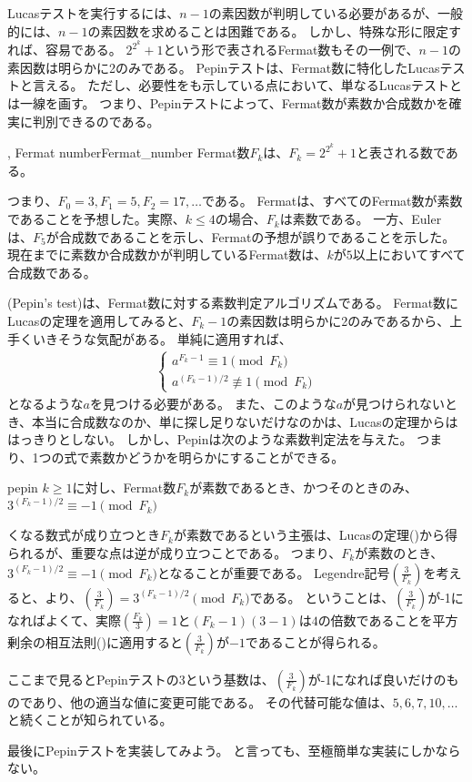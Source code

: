 Lucasテストを実行するには、$n-1$の素因数が判明している必要があるが、一般的には、$n-1$の素因数を求めることは困難である。
しかし、特殊な形に限定すれば、容易である。
$2^{2^k} + 1$という形で表されるFermat数もその一例で、$n-1$の素因数は明らかに2のみである。
Pepinテストは、Fermat数に特化したLucasテストと言える。
ただし、必要性をも示している点において、単なるLucasテストとは一線を画す。
つまり、Pepinテストによって、Fermat数が素数か合成数かを確実に判別できるのである。

\begin{Defi}{, Fermat number}{Fermat_number}
Fermat数$F_k$は、$F_k=2^{2^k} + 1$と表される数である。
\end{Defi}

つまり、$F_0=3, F_1 = 5, F_2 = 17,\ldots$である。
Fermatは、すべてのFermat数が素数であることを予想した。実際、$k \le 4$の場合、$F_k$は素数である。
一方、Eulerは、$F_5$が合成数であることを示し、Fermatの予想が誤りであることを示した。
現在までに素数か合成数かが判明しているFermat数は、$k$が$5$以上においてすべて合成数である。

(Pepin's test)は、Fermat数に対する素数判定アルゴリズムである。
Fermat数にLucasの定理を適用してみると、$F_k - 1$の素因数は明らかに2のみであるから、上手くいきそうな気配がある。
単純に適用すれば、
\begin{align*}
\begin{cases}
a^{F_k-1} \equiv 1 \pmod{F_k}\\
a^{(F_k-1)/2} \not\equiv 1 \pmod{F_k}
\end{cases}
\end{align*}
となるような$a$を見つける必要がある。
また、このような$a$が見つけられないとき、本当に合成数なのか、単に探し足りないだけなのかは、Lucasの定理からははっきりとしない。
しかし、Pepinは次のような素数判定法を与えた。
つまり、1つの式で素数かどうかを明らかにすることができる。

\begin{Theo}{}{pepin}
$k\ge1$に対し、Fermat数$F_k$が素数であるとき、かつそのときのみ、$3^{(F_k - 1)/2}\equiv-1\pmod{F_k}$
\end{Theo}

くなる数式が成り立つとき$F_k$が素数であるという主張は、Lucasの定理()から得られるが、重要な点は逆が成り立つことである。
つまり、$F_k$が素数のとき、$3^{(F_k - 1)/2}\equiv-1\pmod{F_k}$となることが重要である。
Legendre記号$\left(\frac{3}{F_k}\right)$を考えると、より、$\left(\frac{3}{F_k}\right)=3^{(F_k - 1)/2}\pmod{F_k}$である。
ということは、$\left(\frac{3}{F_k}\right)$が-1になればよくて、実際$\left(\frac{F_k}{3}\right)=1$と$(F_k-1)(3-1)$は$4$の倍数であることを平方剰余の相互法則()に適用すると$\left(\frac{3}{F_k}\right)$が$-1$であることが得られる。

ここまで見るとPepinテストの3という基数は、$\left(\frac{3}{F_k}\right)$が-1になれば良いだけのものであり、他の適当な値に変更可能である。
その代替可能な値は、$5,6,7,10,\ldots$と続くことが知られている。

最後にPepinテストを実装してみよう。
と言っても、至極簡単な実装にしかならない。

